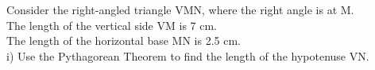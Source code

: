 \documentclass[preview]{standalone}
\begin{document}
\begin{center}
\begin{minipage}{12cm}
\raggedright Consider the right-angled triangle VMN, where the right angle is at M. \\
 The length of the vertical side VM is 7 cm. \\
 The length of the horizontal base MN is 2.5 cm. \\
 i) Use the Pythagorean Theorem to find the length of the hypotenuse VN.
\end{minipage}
\end{center}
\end{document}
